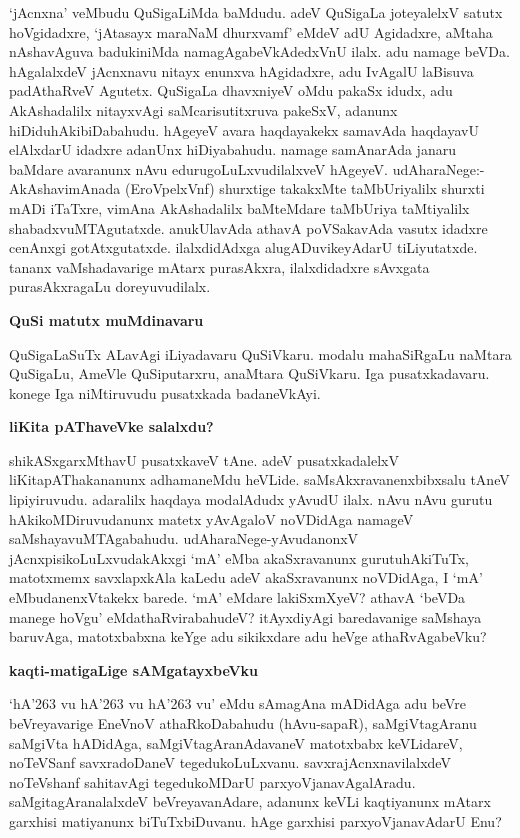 \noindent
`jAcnxna' veMbudu QuSigaLiMda baMdudu. adeV QuSigaLa joteyalelxV satutx 
hoVgidadxre, `jAtasayx maraNaM dhurxvamf'\label{122a} eMdeV adU Agidadxre, aMtaha nAshavAguva badukiniMda namagAgabeVkAdedxVnU ilalx. adu namage beVDa. hAgalalxdeV jAcnxnavu nitayx enunxva hAgidadxre, adu IvAgalU laBisuva padAthaRveV Agutetx. QuSigaLa dhavxniyeV oMdu pakaSx idudx, adu AkAshadalilx nitayxvAgi saMcarisutitxruva pakeSxV, adanunx hiDiduhAkibiDabahudu. hAgeyeV avara haqdayakekx samavAda haqdayavU elAlxdarU idadxre adanUnx
hiDiyabahudu. namage samAnarAda janaru baMdare avaranunx nAvu edurugoLuLxvudilalxveV hAgeyeV. udAharaNege:- AkAshavimAnada (EroVpelxVnf) shurxtige takakxMte taMbUriyalilx shurxti mADi iTaTxre, vimAna AkAshadalilx baMteMdare taMbUriya taMtiyalilx shabadxvuMTAgutatxde. anukUlavAda athavA poVSakavAda vasutx idadxre cenAnxgi gotAtxgutatxde. ilalxdidAdxga alugADuvikeyAdarU tiLiyutatxde. tananx vaMshadavarige mAtarx purasAkxra, ilalxdidadxre sAvxgata purasAkxragaLu doreyuvudilalx.

{\medskip
\noindent
{\large\bf QuSi matutx muMdinavaru}}\label{page123}
\medskip

\noindent
QuSigaLaSuTx ALavAgi iLiyadavaru QuSiVkaru. modalu mahaSiRgaLu naMtara QuSigaLu, AmeVle QuSiputarxru, anaMtara QuSiVkaru. Iga pusatxkadavaru. konege Iga niMtiruvudu pusatxkada badaneVkAyi.

{\medskip
\noindent
{\large\bf liKita pAThaveVke salalxdu?}}\label{page123a}
\medskip

\noindent
shikASxgarxMthavU pusatxkaveV tAne. adeV pusatxkadalelxV liKitapAThakananunx adhamaneMdu heVLide. saMsAkxravanenxbibxsalu tAneV lipiyiruvudu. adaralilx haqdaya modalAdudx yAvudU ilalx. nAvu nAvu gurutu hAkikoMDiruvudanunx matetx yAvAgaloV noVDidAga namageV saMshayavuMTAgabahudu. udAharaNege-yAvudanonxV jAcnxpisikoLuLxvudakAkxgi `mA' eMba akaSxravanunx gurutuhAkiTuTx, matotxmemx savxlapxkAla kaLedu adeV akaSxravanunx noVDidAga, I `mA' eMbudanenxVtakekx barede. `mA' eMdare lakiSxmXyeV? athavA `beVDa manege hoVgu'  eMdathaRvirabahudeV? itAyxdiyAgi baredavanige saMshaya baruvAga, matotxbabxna keYge adu sikikxdare adu heVge athaRvAgabeVku?

{\bigskip
\noindent
{\large\bf kaqti-matigaLige sAMgatayxbeVku}}\label{page123b}
\medskip

\noindent
`hA\char'263 vu hA\char'263 vu hA\char'263 vu' eMdu sAmagAna mADidAga adu beVre beVreyavarige EneVnoV athaRkoDabahudu (hAvu-sapaR), saMgiVtagAranu saMgiVta hADidAga, saMgiVtagAranAdavaneV matotxbabx keVLidareV, noTeVSanf savxradoDaneV tegedukoLuLxvanu. savxrajAcnxnavilalxdeV noTeVshanf sahitavAgi tegedukoMDarU parxyoVjanavAgalAradu. saMgitagAranalalxdeV beVreyavanAdare, adanunx keVLi kaqtiyanunx mAtarx \hbox{garxhisi} matiyanunx biTuTxbiDuvanu. hAge \hbox{garxhisi} parxyoVjanavAdarU Enu?

